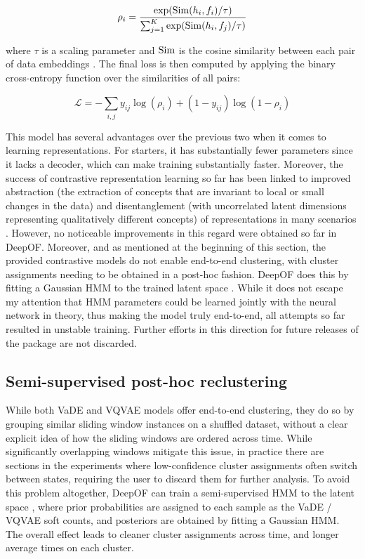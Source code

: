 \begin{equation}
\rho_{i} = \frac{\exp(\mathrm{Sim}(h_{i}, f_{i})/\tau)}{\sum_{j=1}^{K}\exp(\mathrm{Sim}(h_{i}, f_{j})/\tau)}
\label{eq:3.6}
\end{equation}

\noindent where $\tau$ is a scaling parameter and $\mathrm{Sim}$ is the cosine similarity between each pair of data embeddings \cite{Deldari2021TimeCoding}. The final loss is then computed by applying the binary cross-entropy function over the similarities of all pairs:

\begin{equation}
\mathcal{L} = -\sum_{i,j} y_{ij} \log(\rho_{i}) + (1 - y_{ij}) \log(1 - \rho_{i})
\label{eq:3.7}
\end{equation}

This model has several advantages over the previous two when it comes to learning representations. For starters, it has substantially fewer parameters since it lacks a decoder, which can make training substantially faster. Moreover, the success of contrastive representation learning so far has been linked to improved abstraction (the extraction of concepts that are invariant to local or small changes in the data) and disentanglement (with uncorrelated latent dimensions representing qualitatively different concepts) of representations in many scenarios \cite{Le-Khac2020ContrastiveReview}. However, no noticeable improvements in this regard were obtained so far in DeepOF. Moreover, and as mentioned at the beginning of this section, the provided contrastive models do not enable end-to-end clustering, with cluster assignments needing to be obtained in a post-hoc fashion. DeepOF does this by fitting a Gaussian HMM to the trained latent space \cite{Schreiber2017Pomegranate:Python}. While it does not escape my attention that HMM parameters could be learned jointly with the neural network in theory, thus making the model truly end-to-end, all attempts so far resulted in unstable training. Further efforts in this direction for future releases of the package are not discarded.

\subsection{Semi-supervised post-hoc reclustering}

While both VaDE and VQVAE models offer end-to-end clustering, they do so by grouping similar sliding window instances on a shuffled dataset, without a clear explicit idea of how the sliding windows are ordered across time. While significantly overlapping windows mitigate this issue, in practice there are sections in the experiments where low-confidence cluster assignments often switch between states, requiring the user to discard them for further analysis. To avoid this problem altogether, DeepOF can train a semi-supervised HMM to the latent space \cite{Schreiber2017Pomegranate:Python}, where prior probabilities are assigned to each sample as the VaDE / VQVAE soft counts, and posteriors are obtained by fitting a Gaussian HMM. The overall effect leads to cleaner cluster assignments across time, and longer average times on each cluster.

